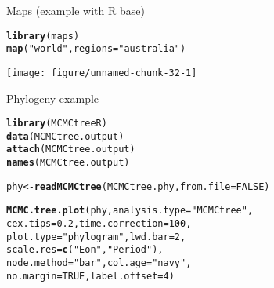 \documentclass[10pt]{beamer}\usepackage[]{graphicx}\usepackage[]{color}
\makeatletter
\newcommand{\hlnum}[1]{\textcolor[rgb]{0.686,0.059,0.569}{#1}}%
\newcommand{\hlstr}[1]{\textcolor[rgb]{0.192,0.494,0.8}{#1}}%
\newcommand{\hlstd}[1]{\textcolor[rgb]{0.345,0.345,0.345}{#1}}%
\newcommand{\hlkwb}[1]{\textcolor[rgb]{0.69,0.353,0.396}{#1}}%
\newcommand{\hlkwc}[1]{\textcolor[rgb]{0.333,0.667,0.333}{#1}}%
\newcommand{\hlkwd}[1]{\textcolor[rgb]{0.737,0.353,0.396}{\textbf{#1}}}%
\newenvironment{kframe}{%
 \def\at@end@of@kframe{}%
 \ifinner\ifhmode%
  \def\at@end@of@kframe{\end{minipage}}%
  \begin{minipage}{\columnwidth}%
 \fi\fi%
 \def\FrameCommand##1{\hskip\@totalleftmargin \hskip-\fboxsep
 \colorbox{shadecolor}{##1}\hskip-\fboxsep
     \hskip-\linewidth \hskip-\@totalleftmargin \hskip\columnwidth}%
 \MakeFramed {\advance\hsize-\width
   \@totalleftmargin\z@ \linewidth\hsize
   \@setminipage}}%
 {\par\unskip\endMakeFramed%
 \at@end@of@kframe}
\newenvironment{knitrout}{}{} %
\makeatother
\begin{document}
\begin{frame}{Maps (example with R base)}

\begin{knitrout}
\color{fgcolor}\begin{kframe}
\begin{alltt}
\hlkwd{library}\hlstd{(maps)}
\hlkwd{map}\hlstd{(}\hlstr{"world"}\hlstd{,} \hlkwc{regions} \hlstd{=} \hlstr{"australia"}\hlstd{)}
\end{alltt}
\end{kframe}
\texttt{[image: figure/unnamed-chunk-32-1]} 

\end{knitrout}

\end{frame}

\begin{frame}[fragile]{Phylogeny example}
\begin{knitrout}
\color{fgcolor}\begin{kframe}
\begin{alltt}
\hlkwd{library}\hlstd{(MCMCtreeR)}
\hlkwd{data}\hlstd{(MCMCtree.output)}
\hlkwd{attach}\hlstd{(MCMCtree.output)}
\hlkwd{names}\hlstd{(MCMCtree.output)}

\hlstd{phy} \hlkwb{<-} \hlkwd{readMCMCtree}\hlstd{(MCMCtree.phy,} \hlkwc{from.file} \hlstd{=} \hlnum{FALSE}\hlstd{)}

\hlkwd{MCMC.tree.plot}\hlstd{(phy,} \hlkwc{analysis.type} \hlstd{=} \hlstr{"MCMCtree"}\hlstd{,}
    \hlkwc{cex.tips} \hlstd{=} \hlnum{0.2}\hlstd{,} \hlkwc{time.correction} \hlstd{=} \hlnum{100}\hlstd{,}
    \hlkwc{plot.type} \hlstd{=} \hlstr{"phylogram"}\hlstd{,} \hlkwc{lwd.bar} \hlstd{=} \hlnum{2}\hlstd{,}
    \hlkwc{scale.res} \hlstd{=} \hlkwd{c}\hlstd{(}\hlstr{"Eon"}\hlstd{,} \hlstr{"Period"}\hlstd{),}
    \hlkwc{node.method} \hlstd{=} \hlstr{"bar"}\hlstd{,} \hlkwc{col.age} \hlstd{=} \hlstr{"navy"}\hlstd{,}
    \hlkwc{no.margin} \hlstd{=} \hlnum{TRUE}\hlstd{,} \hlkwc{label.offset} \hlstd{=} \hlnum{4}\hlstd{)}
\end{alltt}
\end{kframe}
\end{knitrout}
\end{frame}
\end{document}
